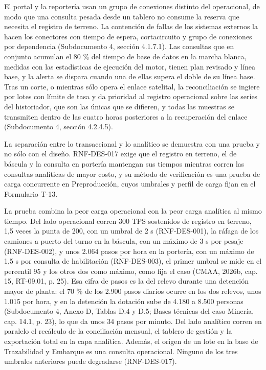 \documentclass[subdoc]{../../comun/overfore}
\begin{document}
El portal y la reportería usan un grupo de conexiones distinto del operacional, de modo que una consulta pesada desde un tablero no consume la reserva que necesita el registro de terreno. La contención de fallas de los sistemas externos la hacen los conectores con tiempo de espera, cortacircuito y grupo de conexiones por dependencia (Subdocumento 4, sección 4.1.7.1). Las consultas que en conjunto acumulan el 80 \% del tiempo de base de datos en la marcha blanca, medidas con las estadísticas de ejecución del motor, tienen plan revisado y línea base, y la alerta se dispara cuando una de ellas supera el doble de su línea base. Tras un corte, o mientras sólo opera el enlace satelital, la reconciliación se ingiere por lotes con límite de tasa y da prioridad al registro operacional sobre las series del historiador, que son las únicas que se difieren, y todas las muestras se transmiten dentro de las cuatro horas posteriores a la recuperación del enlace (Subdocumento 4, sección 4.2.4.5).

La separación entre lo transaccional y lo analítico se demuestra con una prueba y no sólo con el diseño. RNF-DES-017 exige que el registro en terreno, el de báscula y la consulta en portería mantengan sus tiempos mientras corren las consultas analíticas de mayor costo, y su método de verificación es una prueba de carga concurrente en Preproducción, cuyos umbrales y perfil de carga fijan en el Formulario T-13.

La prueba combina la peor carga operacional con la peor carga analítica al mismo tiempo. Del lado operacional corren 300 TPS sostenidos de registro en terreno, 1,5 veces la punta de 200, con un umbral de 2 s (RNF-DES-001), la ráfaga de los camiones a puerto del turno en la báscula, con un máximo de 3 s por pesaje (RNF-DES-002), y unos 2.064 pasos por hora en la portería, con un máximo de 1,5 s por consulta de habilitación (RNF-DES-003), el primer umbral se mide en el percentil 95 y los otros dos como máximo, como fija el caso (CMAA, 2026b, cap. 15, RT-09.01, p. 25). Esa cifra de pasos es la del relevo durante una detención mayor de planta: el 70 \% de los 2.900 pasos diarios ocurre en los dos relevos, unos 1.015 por hora, y en la detención la dotación sube de 4.180 a 8.500 personas (Subdocumento 4, Anexo D, Tablas D.4 y D.5; Bases técnicas del caso Minería, cap. 14.1, p. 23), lo que da unos 34 pasos por minuto. Del lado analítico corren en paralelo el recálculo de la conciliación mensual, el tablero de gestión y la exportación total en la capa analítica. Además, el origen de un lote en la base de Trazabilidad y Embarque es una consulta operacional. Ninguno de los tres umbrales anteriores puede degradarse (RNF-DES-017).
\end{document}

